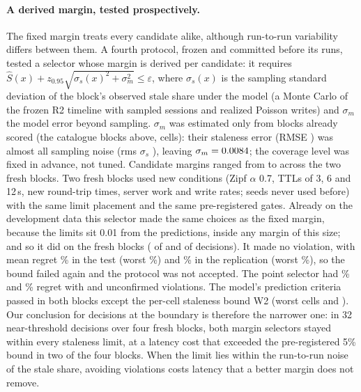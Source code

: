 \documentclass[acmsmall,review,nonacm]{acmart}
\begin{document}
\paragraph{A derived margin, tested prospectively.}
The fixed margin treats every candidate alike, although run-to-run variability differs between them. A fourth protocol, frozen and committed before its runs, tested a selector whose margin is derived per candidate: it requires $\hat S(x) + z_{0.95}\sqrt{\sigma_s(x)^2+\sigma_m^2} \le \varepsilon$, where $\sigma_s(x)$ is the sampling standard deviation of the block's observed stale share under the model (a Monte Carlo of the frozen R2 timeline with sampled sessions and realized Poisson writes) and $\sigma_m$ the model error beyond sampling. $\sigma_m$ was estimated only from blocks already scored (the catalogue blocks above, \ccCells{} cells): their staleness error (RMSE \ccRmse) was almost all sampling noise (rms $\sigma_s$ \ccRmsSds), leaving $\sigma_m = 0.0084$; the coverage level was fixed in advance, not tuned. Candidate margins ranged from \ccTMarginMin{} to \ccRMarginMax{} across the two fresh blocks. Two fresh blocks used new conditions (Zipf $\alpha$ 0.7, TTLs of 3, 6 and 12\,s, new round-trip times, server work and write rates; seeds never used before) with the same limit placement and the same pre-registered gates. Already on the development data this selector made the same choices as the fixed margin, because the limits sit 0.01 from the predictions, inside any margin of this size; and so it did on the fresh blocks (\ccTSame{} of \ccTCcDec{} and \ccRSame{} of \ccRCcDec{} decisions). It made no violation, with mean regret \ccTCcRegret\% in the test (worst \ccTCcWorst\%) and \ccRCcRegret\% in the replication (worst \ccRCcWorst\%), so the bound failed again and the protocol was not accepted. The point selector had \ccTPointRegret\% and \ccRPointRegret\% regret with \ccTPointViol{} and \ccRPointViol{} unconfirmed violations. The model's prediction criteria passed in both blocks except the per-cell staleness bound W2 (worst cells \ccTWtwo{} and \ccRWtwo). Our conclusion for decisions at the boundary is therefore the narrower one: in 32 near-threshold decisions over four fresh blocks, both margin selectors stayed within every staleness limit, at a latency cost that exceeded the pre-registered 5\% bound in two of the four blocks. When the limit lies within the run-to-run noise of the stale share, avoiding violations costs latency that a better margin does not remove.
\end{document}
